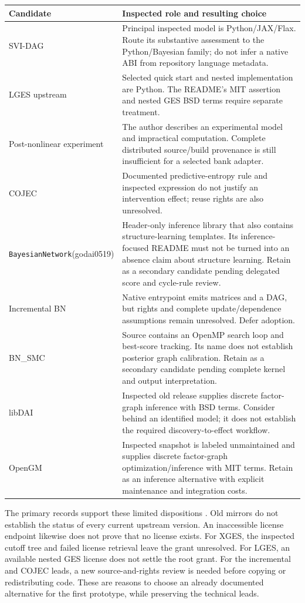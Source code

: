 \begin{longtable}{@{}P{.26\linewidth}P{.66\linewidth}@{}}
\toprule
Candidate & Inspected role and resulting choice\\
\midrule
\endhead
SVI-DAG & Principal inspected model is Python/JAX/Flax. Route its substantive
assessment to the Python/Bayesian family; do not infer a native ABI from
repository language metadata.\\
LGES upstream & Selected quick start and nested implementation are Python.
The README's MIT assertion and nested GES BSD terms require separate treatment.\\
Post-nonlinear experiment & The author describes an experimental model and
impractical computation. Complete distributed source/build provenance is still
insufficient for a selected bank adapter.\\
COJEC & Documented predictive-entropy rule and inspected expression do not
justify an intervention effect; reuse rights are also unresolved.\\
\texttt{BayesianNetwork}\newline (godai0519) & Header-only inference library that also
contains structure-learning templates. Its inference-focused README must not
be turned into an absence claim about structure learning. Retain as a
secondary candidate pending delegated score and cycle-rule review.\\
Incremental BN & Native entrypoint emits matrices and a DAG, but rights and
complete update/dependence assumptions remain unresolved. Defer adoption.\\
BN\_SMC & Source contains an OpenMP search loop and best-score tracking. Its
name does not establish posterior graph calibration. Retain as a secondary
candidate pending complete kernel and output interpretation.\\
libDAI & Inspected old release supplies discrete factor-graph inference with
BSD terms. Consider behind an identified model; it does not establish the
required discovery-to-effect workflow.\\
OpenGM & Inspected snapshot is labeled unmaintained and supplies discrete
factor-graph optimization/inference with MIT terms. Retain as an inference
alternative with explicit maintenance and integration costs.\\
\bottomrule
\end{longtable}

The primary records support these limited dispositions
\citep{exec13_cxx_svidag,exec13_cxx_lges,exec13_cxx_other_leads,
exec13_cxx_inference}. Old mirrors do not establish the status of every
current upstream version. An inaccessible license endpoint likewise does
not prove that no license exists. For XGES, the inspected cutoff tree and
failed license retrieval leave the grant unresolved. For LGES, an available
nested GES license does not settle the root grant. For the incremental and
COJEC leads, a new source-and-rights review is needed before copying or
redistributing code. These are reasons to choose an already documented
alternative for the first prototype, while preserving the technical leads.

